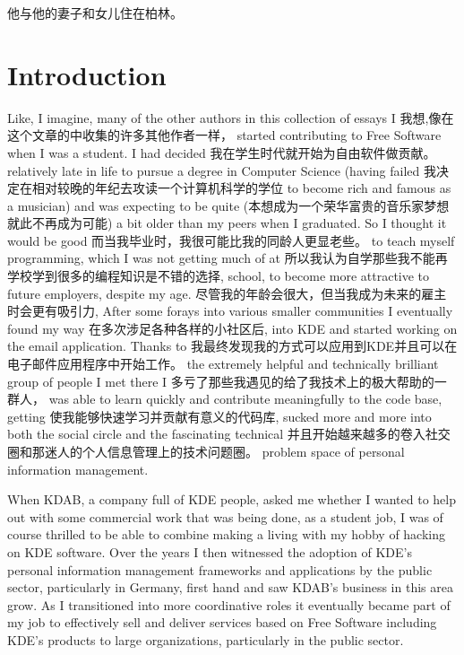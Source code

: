 
他与他的妻子和女儿住在柏林。
\section*{Introduction}

Like, I imagine, many of the other authors in this collection of essays I
我想,像在这个文章的中收集的许多其他作者一样，
started contributing to Free Software when I was a student. I had decided
我在学生时代就开始为自由软件做贡献。
relatively late in life to pursue a degree in Computer Science (having failed
我决定在相对较晚的年纪去攻读一个计算机科学的学位
to become rich and famous as a musician) and was expecting to be quite
(本想成为一个荣华富贵的音乐家梦想就此不再成为可能)
a bit older than my peers when I graduated. So I thought it would be good
而当我毕业时，我很可能比我的同龄人更显老些。
to teach myself programming, which I was not getting much of at
所以我认为自学那些我不能再学校学到很多的编程知识是不错的选择,
school, to become more attractive to future employers, despite my age.
尽管我的年龄会很大，但当我成为未来的雇主时会更有吸引力,
After some forays into various smaller communities I eventually found my way
在多次涉足各种各样的小社区后,
into KDE and started working on the email application. Thanks to
我最终发现我的方式可以应用到KDE并且可以在电子邮件应用程序中开始工作。
the extremely helpful and technically brilliant group of people I met there I
多亏了那些我遇见的给了我技术上的极大帮助的一群人，
was able to learn quickly and contribute meaningfully to the code base, getting
使我能够快速学习并贡献有意义的代码库,
sucked more and more into both the social circle and the fascinating technical
并且开始越来越多的卷入社交圈和那迷人的个人信息管理上的技术问题圈。
problem space of personal information management.

When KDAB, a company full of KDE people, asked me whether I wanted to help out
with some commercial work that was being done, as a student job, I was of
course thrilled to be able to combine making a living with my hobby of hacking
on KDE software. Over the years I then witnessed the adoption of KDE's personal
information management frameworks and applications by the public sector,
particularly in Germany, first hand and saw KDAB's business in this area grow.
As I transitioned into more coordinative roles it eventually became part of my
job to effectively sell and deliver services based on Free Software including KDE's products
to large organizations, particularly in the public sector.

